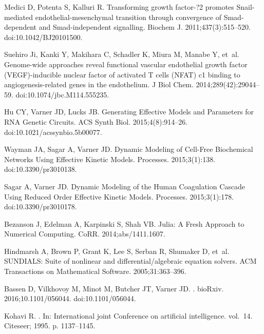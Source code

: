 \documentclass[11pt,letterpaper]{article}
\begin{document}
\begin{thebibliography}{10}
Medici D, Potenta S, Kalluri R.
\newblock Transforming growth factor-?2 promotes Snail-mediated
  endothelial-mesenchymal transition through convergence of Smad-dependent and
  Smad-independent signalling.
\newblock Biochem J. 2011;437(3):515--520.
\newblock doi:{10.1042/BJ20101500}.

Suehiro Ji, Kanki Y, Makihara C, Schadler K, Miura M, Manabe Y, et~al.
\newblock Genome-wide approaches reveal functional vascular endothelial growth
  factor (VEGF)-inducible nuclear factor of activated T cells (NFAT) c1 binding
  to angiogenesis-related genes in the endothelium.
\newblock J Biol Chem. 2014;289(42):29044--59.
\newblock doi:{10.1074/jbc.M114.555235}.

Hu CY, Varner JD, Lucks JB.
\newblock Generating Effective Models and Parameters for RNA Genetic Circuits.
\newblock ACS Synth Biol. 2015;4(8):914--26.
\newblock doi:{10.1021/acssynbio.5b00077}.

Wayman JA, Sagar A, Varner JD.
\newblock Dynamic Modeling of Cell-Free Biochemical Networks Using Effective
  Kinetic Models.
\newblock Processes. 2015;3(1):138.
\newblock doi:{10.3390/pr3010138}.

Sagar A, Varner JD.
\newblock Dynamic Modeling of the Human Coagulation Cascade Using Reduced Order
  Effective Kinetic Models.
\newblock Processes. 2015;3(1):178.
\newblock doi:{10.3390/pr3010178}.

Bezanson J, Edelman A, Karpinski S, Shah VB.
\newblock Julia: {A} Fresh Approach to Numerical Computing.
\newblock CoRR. 2014;abs/1411.1607.

Hindmarsh A, Brown P, Grant K, Lee S, Serban R, Shumaker D, et~al.
\newblock SUNDIALS: Suite of nonlinear and differential/algebraic equation
  solvers.
\newblock ACM Transactions on Mathematical Software. 2005;31:363--396.

Bassen D, Vilkhovoy M, Minot M, Butcher JT, Varner JD.
.
\newblock bioRxiv. 2016;10.1101/056044.
\newblock doi:{10.1101/056044}.

Kohavi R.
.
\newblock In: International joint Conference on artificial intelligence.
  vol.~14. Citeseer; 1995. p. 1137--1145.


\end{thebibliography}
\end{document}
